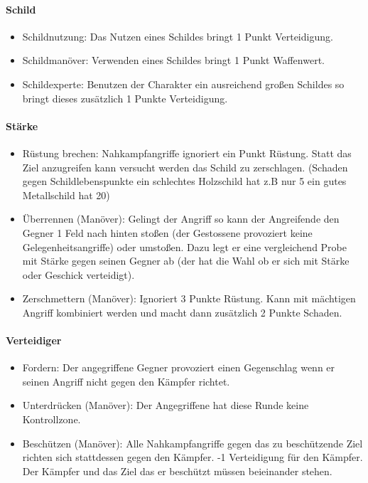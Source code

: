 \documentclass{article}
\begin{document}
\paragraph{Schild}

\begin{itemize}
\item Schildnutzung: Das Nutzen eines Schildes bringt 1 Punkt Verteidigung.
\item Schildmanöver: Verwenden eines Schildes bringt 1 Punkt Waffenwert.
\item Schildexperte: Benutzen der Charakter ein ausreichend großen Schildes so bringt dieses zusätzlich 1 Punkte Verteidigung.
\end{itemize}

\paragraph{Stärke}


\begin{itemize}
\item Rüstung brechen: Nahkampfangriffe ignoriert ein Punkt Rüstung. Statt das Ziel anzugreifen kann versucht werden das Schild zu zerschlagen. (Schaden gegen Schildlebenspunkte ein schlechtes Holzschild  hat z.B nur 5 ein gutes Metallschild hat 20)
\item Überrennen (Manöver): Gelingt der Angriff so kann der Angreifende den Gegner 1 Feld nach hinten stoßen (der Gestossene provoziert keine Gelegenheitsangriffe) oder umstoßen. Dazu legt er eine vergleichend Probe mit Stärke gegen seinen Gegner ab (der hat die Wahl ob er sich mit Stärke oder Geschick verteidigt).
\item Zerschmettern (Manöver): Ignoriert 3 Punkte Rüstung. Kann mit mächtigen Angriff kombiniert werden und macht dann zusätzlich 2 Punkte Schaden.
\end{itemize}

\paragraph{Verteidiger}

\begin{itemize}
\item Fordern: Der angegriffene Gegner provoziert einen Gegenschlag wenn er seinen Angriff nicht gegen den Kämpfer richtet.
\item Unterdrücken (Manöver): Der Angegriffene hat diese Runde keine Kontrollzone.
\item Beschützen (Manöver): Alle Nahkampfangriffe gegen das zu beschützende Ziel richten sich stattdessen gegen den Kämpfer. -1 Verteidigung für den Kämpfer. Der Kämpfer und das Ziel das er beschützt müssen beieinander stehen.
\end{itemize}
\end{document}
